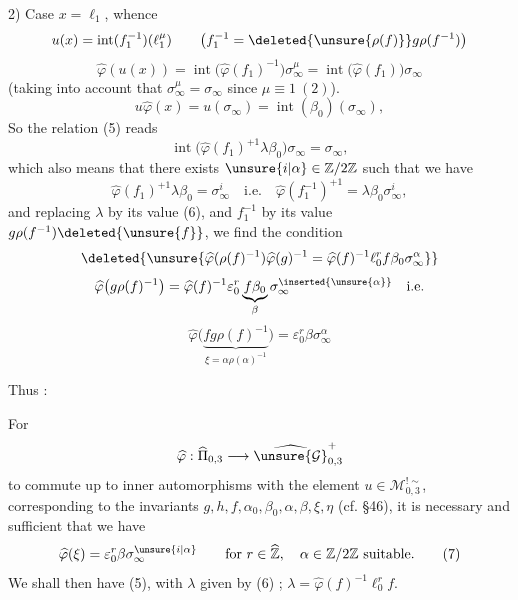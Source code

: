 2) Case $x=\ell_1$, whence
\[
u(x)=\operatorname{int}(f_1^{-1})(\ell_1^\mu)
\qquad\bigl(f_1^{-1}=\deleted{\unsure{\rho(f)}}g\rho(f^{-1})\bigr)
\]
\[
\widehat\varphi(u(x))=\operatorname{int}\bigl(\widehat\varphi(f_1)^{-1}\bigr)\sigma_\infty^\mu=\operatorname{int}\bigl(\widehat\varphi(f_1)\bigr)\sigma_\infty
\]
(taking into account that $\sigma_\infty^\mu=\sigma_\infty$ since $\mu\equiv1\ (2)$).
\[
u\widehat\varphi(x)=u(\sigma_\infty)=\operatorname{int}(\beta_0)(\sigma_\infty),
\]
So the relation (5) reads
\[
\operatorname{int}\bigl(\widehat\varphi(f_1)^{+1}\lambda\beta_0\bigr)\sigma_\infty=\sigma_\infty,
\]
which also means that there exists $\unsure{i|\alpha}\in\mathbb Z/2\mathbb Z$ such that we have 
\[
\widehat\varphi(f_1)^{+1}\lambda\beta_0=\sigma_\infty^i
\quad\text{i.e.}\quad
\widehat\varphi(f_1^{-1})^{+1}=\lambda\beta_0\sigma_\infty^i,
\]
and replacing $\lambda$ by its value (6), and $f_1^{-1}$ by its value $g\rho(f^{-1})\deleted{\unsure{f}}$, we find the condition
\[
\deleted{\unsure{\widehat\varphi(\rho(f)^{-1})\widehat\varphi(g)^{-1}=\widehat\varphi(f)^{-1}\ell_0^r f\beta_0\sigma_\infty^\alpha}}
\]
\[
\widehat\varphi\bigl(g\rho(f)^{-1}\bigr)=\widehat\varphi(f)^{-1}\varepsilon_0^r\underbrace{f\beta_0}_{\beta}\sigma_\infty^{\inserted{\unsure{\alpha}}}\quad\text{i.e.}
\]
\[
\widehat\varphi\bigl(\underbrace{fg\rho(f)^{-1}}_{\xi=\alpha\rho(\alpha)^{-1}}\bigr)=\varepsilon_0^r\beta\sigma_\infty^\alpha
\]


Thus :

\uline{} For
\[
\widehat\varphi:\widehat\Pi_{0,3}\longrightarrow
\widehat{\unsure{\mathcal G}}_{0,3}^{+}
\]
to commute up to inner automorphisms with the element
$u\in\mathcal M_{0,3}^{!\sim}$, corresponding to the invariants
$g,h,f,\alpha_0,\beta_0,\alpha,\beta,\xi,\eta$ (cf. \S 46),
it is necessary and sufficient that we have
\[
\widehat\varphi(\xi)=\varepsilon_0^r\beta\sigma_\infty^{\unsure{i|\alpha}}
\qquad\text{for }r\in\widehat{\mathbb Z},\quad
\alpha\in\mathbb Z/2\mathbb Z\ \text{suitable}.
\tag{7}
\]
We shall then have (5), with 
$\lambda$ given by (6) ;
$\lambda=\widehat\varphi(f)^{-1}\ell_0^r f$.

